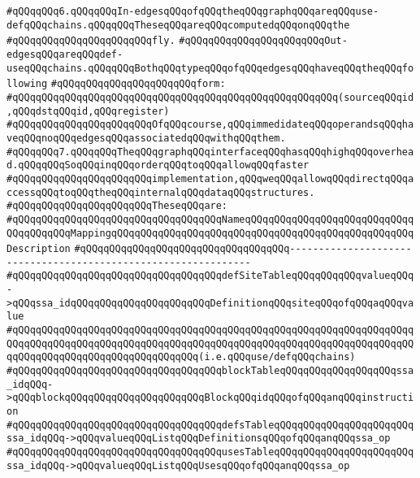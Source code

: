 \verb|#qQQqqQQq6.qQQqqQQqIn-edgesqQQqofqQQqtheqQQqgraphqQQqareqQQquse-defqQQqchains.qQQqqQQqTheseqQQqareqQQqcomputedqQQqonqQQqthe|\newline
\verb|#qQQqqQQqqQQqqQQqqQQqqQQqfly.|\newline
\verb|#qQQqqQQqqQQqqQQqqQQqqQQqOut-edgesqQQqareqQQqdef-useqQQqchains.qQQqqQQqBothqQQqtypeqQQqofqQQqedgesqQQqhaveqQQqtheqQQqfollowing|\newline
\verb|#qQQqqQQqqQQqqQQqqQQqqQQqform:|\newline
\verb|#qQQqqQQqqQQqqQQqqQQqqQQqqQQqqQQqqQQqqQQqqQQqqQQqqQQqqQQq(sourceqQQqid,qQQqdstqQQqid,qQQqregister)|\newline
\verb|#qQQqqQQqqQQqqQQqqQQqqQQqOfqQQqcourse,qQQqimmedidateqQQqoperandsqQQqhaveqQQqnoqQQqedgesqQQqassociatedqQQqwithqQQqthem.|\newline
\verb|#qQQqqQQq7.qQQqqQQqTheqQQqgraphqQQqinterfaceqQQqhasqQQqhighqQQqoverhead.qQQqqQQqSoqQQqinqQQqorderqQQqtoqQQqallowqQQqfaster|\newline
\verb|#qQQqqQQqqQQqqQQqqQQqqQQqimplementation,qQQqweqQQqallowqQQqdirectqQQqaccessqQQqtoqQQqtheqQQqinternalqQQqdataqQQqstructures.|\newline
\verb|#qQQqqQQqqQQqqQQqqQQqqQQqTheseqQQqare:|\newline
\verb|#qQQqqQQqqQQqqQQqqQQqqQQqqQQqqQQqqQQqNameqQQqqQQqqQQqqQQqqQQqqQQqqQQqqQQqqQQqqQQqMappingqQQqqQQqqQQqqQQqqQQqqQQqqQQqqQQqqQQqqQQqqQQqqQQqqQQqDescription|\newline
\verb|#qQQqqQQqqQQqqQQqqQQqqQQqqQQqqQQqqQQq---------------------------------------------------------------|\newline
\verb|#qQQqqQQqqQQqqQQqqQQqqQQqqQQqqQQqqQQqdefSiteTableqQQqqQQqqQQqvalueqQQq->qQQqssa_idqQQqqQQqqQQqqQQqqQQqqQQqDefinitionqQQqsiteqQQqofqQQqaqQQqvalue|\newline
\verb|#qQQqqQQqqQQqqQQqqQQqqQQqqQQqqQQqqQQqqQQqqQQqqQQqqQQqqQQqqQQqqQQqqQQqqQQqqQQqqQQqqQQqqQQqqQQqqQQqqQQqqQQqqQQqqQQqqQQqqQQqqQQqqQQqqQQqqQQqqQQqqQQqqQQqqQQqqQQqqQQqqQQqqQQqqQQq(i.e.qQQquse/defqQQqchains)|\newline
\verb|#qQQqqQQqqQQqqQQqqQQqqQQqqQQqqQQqqQQqblockTableqQQqqQQqqQQqqQQqqQQqssa_idqQQq->qQQqblockqQQqqQQqqQQqqQQqqQQqqQQqBlockqQQqidqQQqofqQQqanqQQqinstruction|\newline
\verb|#qQQqqQQqqQQqqQQqqQQqqQQqqQQqqQQqqQQqdefsTableqQQqqQQqqQQqqQQqqQQqqQQqssa_idqQQq->qQQqvalueqQQqListqQQqDefinitionsqQQqofqQQqanqQQqssa_op|\newline
\verb|#qQQqqQQqqQQqqQQqqQQqqQQqqQQqqQQqqQQqusesTableqQQqqQQqqQQqqQQqqQQqqQQqssa_idqQQq->qQQqvalueqQQqListqQQqUsesqQQqofqQQqanqQQqssa_op|\newline
